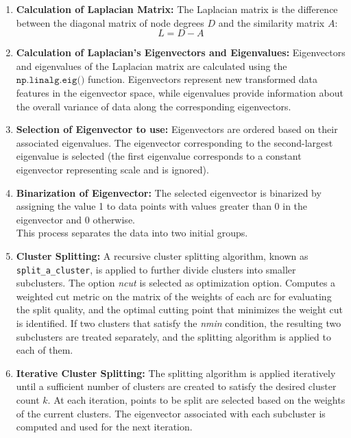 \begin{enumerate}
    
  \item \textbf{Calculation of Laplacian Matrix:}
  The Laplacian matrix is the difference between the diagonal matrix of node degrees \(D\) and the similarity matrix \(A\):
  \begin{equation}
    L = D - A
  \end{equation}
  
  \item \textbf{Calculation of Laplacian's Eigenvectors and Eigenvalues:}
  Eigenvectors and eigenvalues of the Laplacian matrix are calculated using the $\texttt{np.linalg.eig()}$ function. Eigenvectors represent new transformed data features in the eigenvector space, while eigenvalues provide information about the overall variance of data along the corresponding eigenvectors.
  
  \item \textbf{Selection of Eigenvector to use:}
  Eigenvectors are ordered based on their associated eigenvalues.
  The eigenvector corresponding to the second-largest eigenvalue is selected (the first eigenvalue corresponds to a constant eigenvector representing scale and is ignored).
  
  \item \textbf{Binarization of Eigenvector:}
  The selected eigenvector is binarized by assigning the value 1 to data points with values greater than 0 in the eigenvector and 0 otherwise. \\
  This process separates the data into two initial groups.
  
  \item \textbf{Cluster Splitting:}
  A recursive cluster splitting algorithm, known as \texttt{split\_a\_cluster}, is applied to further divide clusters into smaller subclusters.
  The option \textit{ncut} is selected as optimization option.
  Computes a weighted cut metric on the matrix of the weights of each arc for evaluating the split quality, and the optimal cutting point that minimizes the weight cut is identified.
  If two clusters that satisfy the \textit{nmin} condition, the resulting two subclusters are treated separately, and the splitting algorithm is applied to each of them.
  
  \item \textbf{Iterative Cluster Splitting:}
  The splitting algorithm is applied iteratively until a sufficient number of clusters are created to satisfy the desired cluster count $k$.
  At each iteration, points to be split are selected based on the weights of the current clusters.
  The eigenvector associated with each subcluster is computed and used for the next iteration.
  

\end{enumerate}
